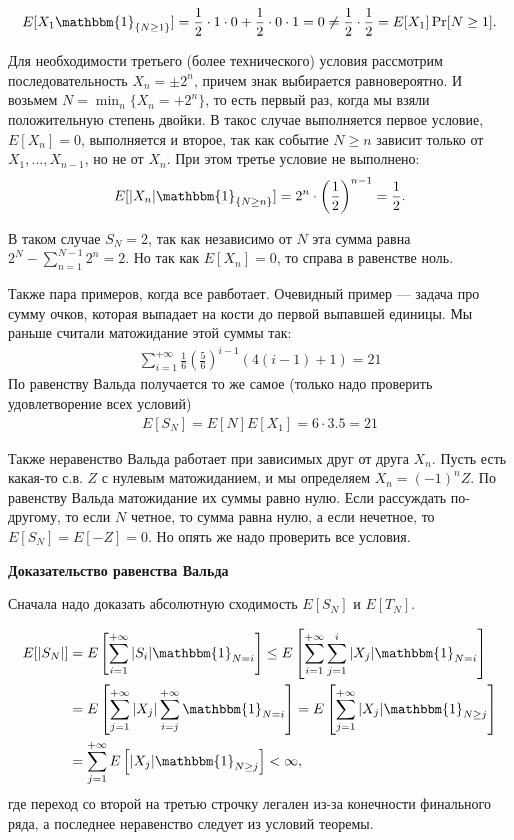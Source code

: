 \documentclass[12pt]{article}
\newcommand\one{\mathbbm{1}}
\begin{document}
\begin{align*}
  E[X_1 \one_{\{N \ge 1\}}] = \frac{1}{2} \cdot 1 \cdot 0 + \frac{1}{2} \cdot 0 \cdot 1 = 0 \ne \frac{1}{2} \cdot \frac{1}{2} = E[X_1] \Pr[N \ge 1].
\end{align*}

Для необходимости третьего (более технического) условия рассмотрим последовательность $X_n = \pm 2^n$, причем знак выбирается равновероятно. И возьмем $N = \min_n \{X_n = +2^n\}$, то есть первый раз, когда мы взяли положительную степень двойки. В такос случае выполняется первое условие, $E[X_n] = 0$, выполняется и второе, так как событие $N \ge n$ зависит только от $X_1, \dots, X_{n - 1}$, но не от $X_n$. При этом третье условие не выполнено:
\begin{align*}
  E[|X_n|\one_{\{N \ge n\}}] = 2^n \cdot \left(\frac{1}{2}\right)^{n - 1} = \frac{1}{2}.
\end{align*}

В таком случае $S_N = 2$, так как независимо от $N$ эта сумма равна $2^N - \sum_{n = 1}^{N - 1} 2^n = 2$. Но так как $E[X_n] = 0$, то справа в равенстве ноль.

Также пара примеров, когда все равботает. Очевидный пример --- задача про сумму очков, которая выпадает на кости до первой выпавшей единицы. Мы раньше считали матожидание этой суммы так:
\begin{align*}
  \sum_{i = 1}^{+\infty} \frac{1}{6} \left(\frac{5}{6}\right)^{i - 1} (4 (i - 1) + 1) = 21
\end{align*}
По равенству Вальда получается то же самое (только надо проверить удовлетворение всех условий)
\begin{align*}
  E[S_N] = E[N] E[X_1] = 6 \cdot 3.5 = 21
\end{align*}

Также неравенство Вальда работает при зависимых друг от друга $X_n$. Пусть есть какая-то с.в. $Z$ с нулевым матожиданием, и мы определяем $X_n = (-1)^n Z$. По равенству Вальда матожидание их суммы равно нулю. Если рассуждать по-другому, то если $N$ четное, то сумма равна нулю, а если нечетное, то $E[S_N] = E[-Z] = 0$. Но опять же надо проверить все условия.

\textbf{Доказательство равенства Вальда}

Сначала надо доказать абсолютную сходимость $E[S_N]$ и $E[T_N]$.

\begin{align*}
  E[|S_N|] &= E\left[\sum_{i = 1}^{+\infty}|S_i|\one_{N = i}\right] \le E\left[\sum_{i = 1}^{+\infty}\sum_{j = 1}^i |X_j| \one_{N = i}\right] \\
  &= E\left[\sum_{j = 1}^{+\infty} |X_j| \sum_{i = j}^{+\infty} \one_{N = i}\right] = E\left[\sum_{j = 1}^{+\infty} |X_j| \one_{N \ge j}\right] \\
  &= \sum_{j = 1}^{+\infty} E\left[|X_j| \one_{N \ge j}\right] < \infty,
\end{align*}
где переход со второй на третью строчку легален из-за конечности финального ряда, а последнее неравенство следует из условий теоремы.
\end{document}
